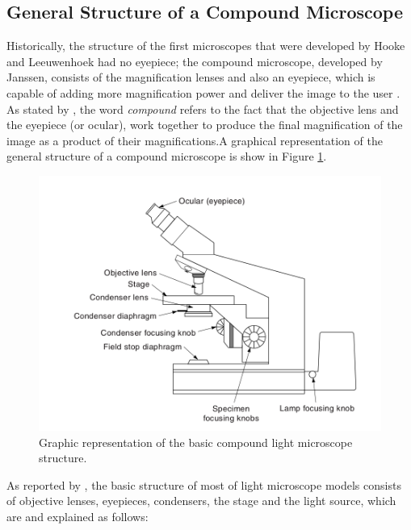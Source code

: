 \subsection{General Structure of a Compound Microscope}

Historically, the structure of the first microscopes that were developed by Hooke and Leeuwenhoek had no eyepiece; the compound microscope, developed by Janssen, consists of the magnification lenses and also an eyepiece, which is capable of adding more magnification power and deliver the image to the user \cite{lawlor2019introduction}. As stated by , the word \emph{compound} refers to the fact that the objective lens and the eyepiece (or ocular), work together to produce the final magnification of the image as a product of their magnifications.A graphical representation of the general structure of a compound microscope is show in Figure \ref{fig:compound_microscope}.

\begin{figure}[H]
	\centering
	\caption{\label{fig:compound_microscope} Graphic representation of the basic compound light microscope structure.}
	\begin{center}
	    \includegraphics[scale=0.4]{images/fig5.png}
	\end{center}
	\centering
\end{figure}

As reported by , the basic structure of most of light microscope models consists of objective lenses, eyepieces, condensers, the stage and the light source, which are and explained as follows:

